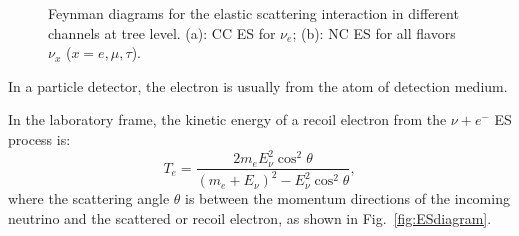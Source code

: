 \begin{figure}[htbp]
	\centering
	\caption[Feynman diagrams for the elastic scattering interaction in different channels at tree level.]{Feynman diagrams for the elastic scattering interaction in different channels at tree level. (a): CC ES for $\nu_e$; (b): NC ES for all flavors $\nu_x$ ($x=e,\mu,\tau$).\label{fig:feynman-es}}
\end{figure}


In a particle detector, the electron is usually from the atom of detection medium. 

In the laboratory frame, the kinetic energy of a recoil electron from the $\nu+e^-$ ES process is\cite{giunti2007fundamentals}:
\begin{equation}
T_e = \frac{2m_eE_\nu^2\cos^2\theta}{(m_e+E_\nu)^2-E_\nu^2\cos^2\theta},
\end{equation}
where the scattering angle $\theta$ is between the momentum directions of the incoming neutrino and the scattered or recoil electron, as shown in Fig.~\ref{fig:ESdiagram}.

